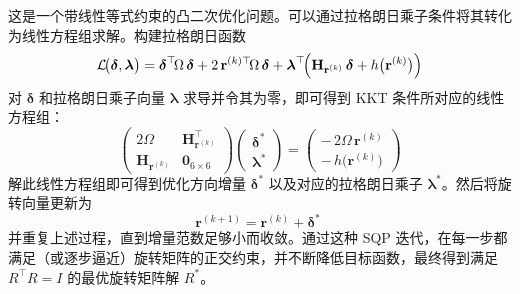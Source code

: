 这是一个带线性等式约束的凸二次优化问题。可以通过拉格朗日乘子条件将其转化为线性方程组求解。构建拉格朗日函数
\begin{equation}
	\mathcal{L}\!\bigl(\boldsymbol{\delta},\boldsymbol{\lambda}\bigr)
	= \boldsymbol{\delta}^{\top}\!\Omega\,\boldsymbol{\delta}
	+ 2\,\mathbf{r}^{(k)\top}\!\Omega\,\boldsymbol{\delta}
	+ \boldsymbol{\lambda}^{\top}\!\Bigl(\mathbf{H}_{\mathbf{r}^{(k)}}\,\boldsymbol{\delta}
	+ h\bigl(\mathbf{r}^{(k)}\bigr)\Bigr)
\end{equation}
对 $\boldsymbol{\delta}$ 和拉格朗日乘子向量 $\boldsymbol{\lambda}$ 求导并令其为零，即可得到 KKT 条件所对应的线性方程组：
\begin{equation}
	\begin{pmatrix}
		2\Omega & \mathbf{H}_{\mathbf{r}^{(k)}}^{\!\top} \\
		\mathbf{H}_{\mathbf{r}^{(k)}} & \mathbf{0}_{6\times6}
	\end{pmatrix}
	\begin{pmatrix}
		\boldsymbol{\delta}^{*} \\
		\boldsymbol{\lambda}^{*}
	\end{pmatrix}
	=
	\begin{pmatrix}
		-\,2\Omega\,\mathbf{r}^{(k)} \\
		-\,h\bigl(\mathbf{r}^{(k)}\bigr)
	\end{pmatrix}
\end{equation}
解此线性方程组即可得到优化方向增量 $\boldsymbol{\delta}^{*}$ 以及对应的拉格朗日乘子 $\boldsymbol{\lambda}^{*}$。然后将旋转向量更新为
\begin{equation}
	\mathbf{r}^{(k+1)} = \mathbf{r}^{(k)} + \boldsymbol{\delta}^{*}\;
\end{equation}
并重复上述过程，直到增量范数足够小而收敛。通过这种 SQP 迭代，在每一步都满足（或逐步逼近）旋转矩阵的正交约束，并不断降低目标函数，最终得到满足 $R^\top R = I$ 的最优旋转矩阵解 $R^{*}$。


